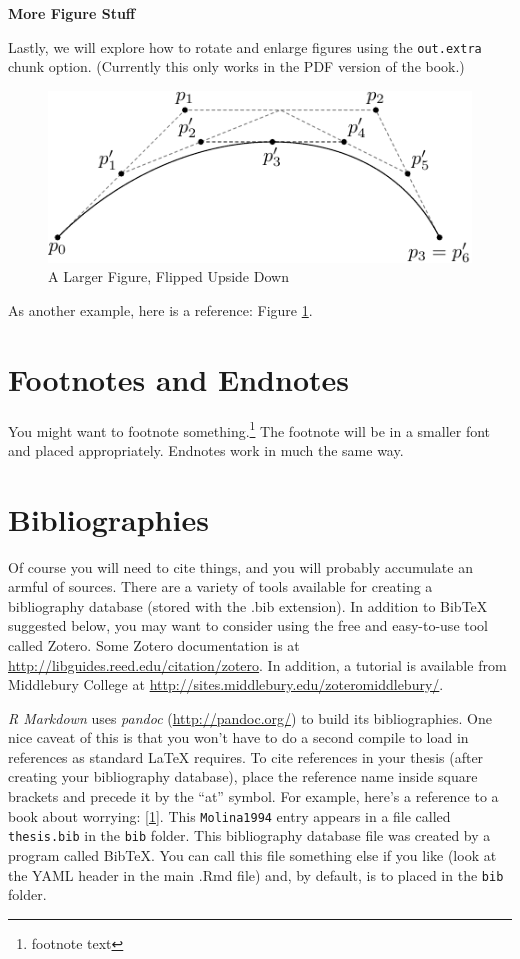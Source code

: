 \documentclass[twoside,12pt,final]{ucthesis-CA2012}
\begin{document}
\begin{ucmainmatter}
\textbf{More Figure Stuff}

Lastly, we will explore how to rotate and enlarge figures using the \texttt{out.extra} chunk option. (Currently this only works in the PDF version of the book.)
\begin{figure}
\includegraphics[angle=180, scale=1.1]{figure/subdivision} \caption{A Larger Figure, Flipped Upside Down}\label{fig:subd2}
\end{figure}
As another example, here is a reference: Figure \ref{fig:subd2}.

\hypertarget{footnotes-and-endnotes}{%
\section{Footnotes and Endnotes}\label{footnotes-and-endnotes}}

You might want to footnote something.\footnote{footnote text} The footnote will be in a smaller font and placed appropriately. Endnotes work in much the same way.

\hypertarget{bibliographies}{%
\section{Bibliographies}\label{bibliographies}}

Of course you will need to cite things, and you will probably accumulate an armful of sources. There are a variety of tools available for creating a bibliography database (stored with the .bib extension). In addition to BibTeX suggested below, you may want to consider using the free and easy-to-use tool called Zotero. Some Zotero documentation is at \url{http://libguides.reed.edu/citation/zotero}. In addition, a tutorial is available from Middlebury College at \url{http://sites.middlebury.edu/zoteromiddlebury/}.

\emph{R Markdown} uses \emph{pandoc} (\url{http://pandoc.org/}) to build its bibliographies. One nice caveat of this is that you won't have to do a second compile to load in references as standard LaTeX requires. To cite references in your thesis (after creating your bibliography database), place the reference name inside square brackets and precede it by the ``at'' symbol. For example, here's a reference to a book about worrying: {[}\protect\hyperlink{ref-Molina1994}{1}{]}. This \texttt{Molina1994} entry appears in a file called \texttt{thesis.bib} in the \texttt{bib} folder. This bibliography database file was created by a program called BibTeX. You can call this file something else if you like (look at the YAML header in the main .Rmd file) and, by default, is to placed in the \texttt{bib} folder.


\end{ucmainmatter}
\end{document}
